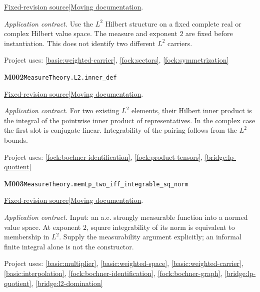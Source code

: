 \documentclass[11pt,a4paper]{article}
\theoremstyle{definition}
\theoremstyle{remark}
\begin{document}
\href{https://github.com/leanprover-community/mathlib4/blob/9bac2d0692944a775113f7c130fd5e5b4608a854/Mathlib/MeasureTheory/Function/L2Space.lean}{Fixed-revision source}\quad|\quad\href{https://leanprover-community.github.io/mathlib4_docs/Mathlib/MeasureTheory/Function/L2Space.html#MeasureTheory.L2.innerProductSpace}{Moving documentation}.\par
\noindent\textit{Application contract.} Use the $L^2$ Hilbert structure on a fixed complete real or complex Hilbert value space. The measure and exponent $2$ are fixed before instantiation. This does not identify two different $L^2$ carriers.\par
{\small Project uses: \ref{basic:weighted-carrier}, \ref{fock:sectors}, \ref{fock:symmetrization}}\par\medskip

\noindent\textbf{M002}\label{base:M002}\quad\nolinkurl{MeasureTheory.L2.inner_def}

\href{https://github.com/leanprover-community/mathlib4/blob/9bac2d0692944a775113f7c130fd5e5b4608a854/Mathlib/MeasureTheory/Function/L2Space.lean}{Fixed-revision source}\quad|\quad\href{https://leanprover-community.github.io/mathlib4_docs/Mathlib/MeasureTheory/Function/L2Space.html#MeasureTheory.L2.inner_def}{Moving documentation}.\par
\noindent\textit{Application contract.} For two existing $L^2$ elements, their Hilbert inner product is the integral of the pointwise inner product of representatives. In the complex case the first slot is conjugate-linear. Integrability of the pairing follows from the $L^2$ bounds.\par
{\small Project uses: \ref{fock:bochner-identification}, \ref{fock:product-tensors}, \ref{bridge:lp-quotient}}\par\medskip

\noindent\textbf{M003}\label{base:M003}\quad\nolinkurl{MeasureTheory.memLp_two_iff_integrable_sq_norm}

\href{https://github.com/leanprover-community/mathlib4/blob/9bac2d0692944a775113f7c130fd5e5b4608a854/Mathlib/MeasureTheory/Function/L2Space.lean}{Fixed-revision source}\quad|\quad\href{https://leanprover-community.github.io/mathlib4_docs/Mathlib/MeasureTheory/Function/L2Space.html#MeasureTheory.memLp_two_iff_integrable_sq_norm}{Moving documentation}.\par
\noindent\textit{Application contract.} Input: an a.e. strongly measurable function into a normed value space. At exponent $2$, square integrability of its norm is equivalent to membership in $L^2$. Supply the measurability argument explicitly; an informal finite integral alone is not the constructor.\par
{\small Project uses: \ref{basic:multiplier}, \ref{basic:weighted-space}, \ref{basic:weighted-carrier}, \ref{basic:interpolation}, \ref{fock:bochner-identification}, \ref{fock:bochner-graph}, \ref{bridge:lp-quotient}, \ref{bridge:l2-domination}}\par\medskip
\end{document}

